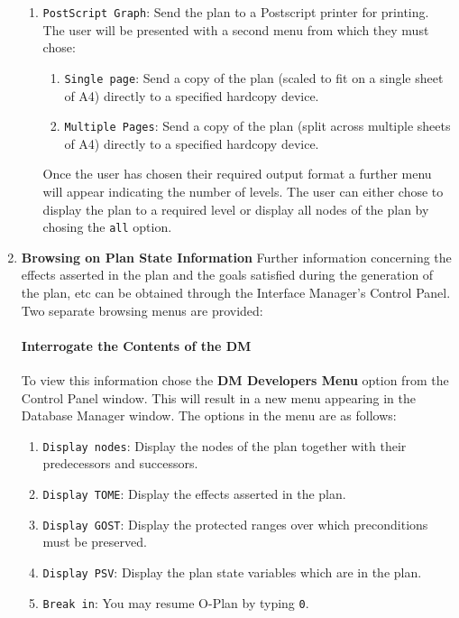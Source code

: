 \begin{enumerate}
\begin{enumerate}
\item {\tt PostScript Graph}: Send the plan to a Postscript printer
for printing.  The user will be presented with a second menu from
which they must chose:
\begin{enumerate}
\item {\tt Single page}: Send a copy of the plan (scaled
to fit on a single sheet of A4) directly to a specified hardcopy
device. 
\item {\tt Multiple Pages}: Send a copy of the plan (split across
multiple sheets of A4) directly to a specified hardcopy
device. 
\end{enumerate}

Once the user has chosen their required output format a further menu
will appear indicating the number of levels. The user can either chose
to display the plan to a required level or display all nodes of the
plan by chosing the {\tt all} option.
\end{enumerate}

\item {\bf Browsing on Plan State Information} \newline
Further information concerning the effects asserted in the plan and
the goals satisfied during the generation of the plan, etc  can be
obtained through the Interface Manager's Control Panel. Two separate
browsing menus are provided:  

\paragraph{Interrogate the Contents of the DM}
To view this information chose the {\bf DM Developers Menu} option from
the Control Panel window. This will result in a new menu appearing in the
Database Manager window. The options in the menu are as follows:

\begin{enumerate}
\item {\tt Display nodes}: Display the nodes of the plan together with
their predecessors and successors.
\item {\tt Display TOME}: Display the effects asserted in the plan.
\item {\tt Display GOST}: Display the protected ranges over which
preconditions must be preserved.
\item {\tt Display PSV}: Display the plan state variables which are in
the plan.
\item {\tt Break in}: You may resume O-Plan by typing {\tt 0}.


\end{enumerate}
\end{enumerate}
